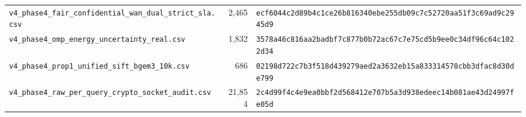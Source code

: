 \begin{table}[t]
{\begin{tabular}{@{}lrl@{}}
\texttt{v4\_phase4\_fair\_confidential\_wan\_dual\_strict\_sla.csv} & 2,465 & \texttt{ecf6044c2d89b4c1ce26b816340ebe255db09c7c52720aa51f3c69ad9c2945d9} \\
\texttt{v4\_phase4\_omp\_energy\_uncertainty\_real.csv} & 1,832 & \texttt{3578a46c816aa2badbf7c877b0b72ac67c7e75cd5b9ee0c34df96c64c1022d34} \\
\texttt{v4\_phase4\_prop1\_unified\_sift\_bgem3\_10k.csv} & 686 & \texttt{02198d722c7b3f518d439279aed2a3632eb15a833314578cbb3dfac8d30de799} \\
\texttt{v4\_phase4\_raw\_per\_query\_crypto\_socket\_audit.csv} & 21,854 & \texttt{2c4d99f4c4e9ea0bbf2d568412e707b5a3d938edeec14b081ae43d24997fe05d} \\
\bottomrule
\end{tabular}%
}
\end{table}
